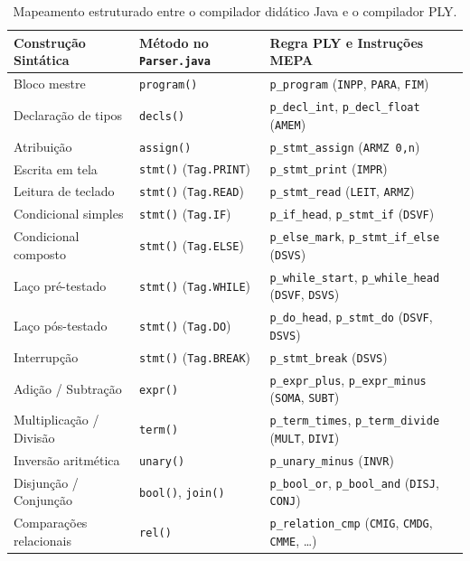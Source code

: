 \documentclass[12pt,a4paper]{article}
\begin{document}
\begin{table}[H]
\centering
\caption{Mapeamento estruturado entre o compilador didático Java e o compilador PLY.}
\label{tab:correspondencia}
\small
\begin{tabular}{p{4.2cm}p{4.8cm}p{5.5cm}}
\toprule
\textbf{Construção Sintática} & \textbf{Método no \texttt{Parser.java}} & \textbf{Regra PLY e Instruções MEPA} \\
\midrule
Bloco mestre & \texttt{program()} & \texttt{p\_program} (\texttt{INPP}, \texttt{PARA}, \texttt{FIM}) \\
Declaração de tipos & \texttt{decls()} & \texttt{p\_decl\_int}, \texttt{p\_decl\_float} (\texttt{AMEM}) \\
Atribuição & \texttt{assign()} & \texttt{p\_stmt\_assign} (\texttt{ARMZ 0,n}) \\
Escrita em tela & \texttt{stmt()} (\texttt{Tag.PRINT}) & \texttt{p\_stmt\_print} (\texttt{IMPR}) \\
Leitura de teclado & \texttt{stmt()} (\texttt{Tag.READ}) & \texttt{p\_stmt\_read} (\texttt{LEIT}, \texttt{ARMZ}) \\
Condicional simples & \texttt{stmt()} (\texttt{Tag.IF}) & \texttt{p\_if\_head}, \texttt{p\_stmt\_if} (\texttt{DSVF}) \\
Condicional composto & \texttt{stmt()} (\texttt{Tag.ELSE}) & \texttt{p\_else\_mark}, \texttt{p\_stmt\_if\_else} (\texttt{DSVS}) \\
Laço pré-testado & \texttt{stmt()} (\texttt{Tag.WHILE}) & \texttt{p\_while\_start}, \texttt{p\_while\_head} (\texttt{DSVF}, \texttt{DSVS}) \\
Laço pós-testado & \texttt{stmt()} (\texttt{Tag.DO}) & \texttt{p\_do\_head}, \texttt{p\_stmt\_do} (\texttt{DSVF}, \texttt{DSVS}) \\
Interrupção & \texttt{stmt()} (\texttt{Tag.BREAK}) & \texttt{p\_stmt\_break} (\texttt{DSVS}) \\
Adição / Subtração & \texttt{expr()} & \texttt{p\_expr\_plus}, \texttt{p\_expr\_minus} (\texttt{SOMA}, \texttt{SUBT}) \\
Multiplicação / Divisão & \texttt{term()} & \texttt{p\_term\_times}, \texttt{p\_term\_divide} (\texttt{MULT}, \texttt{DIVI}) \\
Inversão aritmética & \texttt{unary()} & \texttt{p\_unary\_minus} (\texttt{INVR}) \\
Disjunção / Conjunção & \texttt{bool()}, \texttt{join()} & \texttt{p\_bool\_or}, \texttt{p\_bool\_and} (\texttt{DISJ}, \texttt{CONJ}) \\
Comparações relacionais & \texttt{rel()} & \texttt{p\_relation\_cmp} (\texttt{CMIG}, \texttt{CMDG}, \texttt{CMME}, \dots) \\
\bottomrule
\end{tabular}
\end{table}
\end{document}
